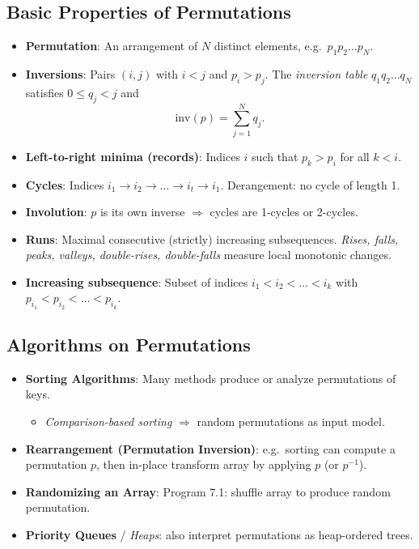 \documentclass[11pt,letterpaper]{article}
\begin{document}
\subsection{Basic Properties of Permutations}
\begin{itemize}
  \item \textbf{Permutation}: An arrangement of $N$ distinct elements, e.g.\ $p_1 p_2 \dots p_N$.
  \item \textbf{Inversions}: Pairs $(i,j)$ with $i < j$ and $p_i > p_j$. The \emph{inversion table} $q_1 q_2 \dots q_N$ satisfies $0 \le q_j < j$ and
    \[
      \mathrm{inv}(p) = \sum_{j=1}^N q_j.
    \]
  \item \textbf{Left-to-right minima (records)}: Indices $i$ such that $p_k > p_i$ for all $k < i$. 
  \item \textbf{Cycles}: Indices $i_1\to i_2\to \dots \to i_t \to i_1$. Derangement: no cycle of length 1.
  \item \textbf{Involution}: $p$ is its own inverse $\Rightarrow$ cycles are 1-cycles or 2-cycles.
  \item \textbf{Runs}: Maximal consecutive (strictly) increasing subsequences. \emph{Rises, falls, peaks, valleys, double-rises, double-falls} measure local monotonic changes.
  \item \textbf{Increasing subsequence}: Subset of indices $i_1 < i_2< \dots < i_k$ with $p_{i_1} < p_{i_2} < \dots < p_{i_k}$.
\end{itemize}

\subsection{Algorithms on Permutations}
\begin{itemize}
  \item \textbf{Sorting Algorithms}: Many methods produce or analyze permutations of keys. 
    \begin{itemize}
      \item \emph{Comparison-based sorting} $\Rightarrow$ random permutations as input model.
    \end{itemize}
  \item \textbf{Rearrangement (Permutation Inversion)}: e.g.\ sorting can compute a permutation $p$, then in-place transform array by applying $p$ (or $p^{-1}$).
  \item \textbf{Randomizing an Array}: Program 7.1: shuffle array to produce random permutation.
  \item \textbf{Priority Queues} / \emph{Heaps}: also interpret permutations as heap-ordered trees.
\end{itemize}
\end{document}
